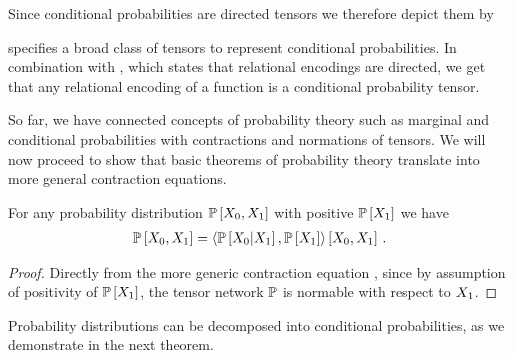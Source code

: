 Since conditional probabilities are directed tensors we therefore depict them by
\begin{center}
	
\end{center}


%
 specifies a broad class of tensors to represent conditional probabilities.
In combination with , which states that relational encodings are directed, we get that any relational encoding of a function is a conditional probability tensor.


So far, we have connected concepts of probability theory such as marginal and conditional probabilities with contractions and normations of tensors.
We will now proceed to show that basic theorems of probability theory translate into more general contraction equations.

\begin{theorem}\label{the:bayes}
	For any probability distribution $\mathbb{P}\left[X_{0}, X_{1}\right]$ with positive $\mathbb{P}\left[X_{1}\right]$ we have
	\begin{align*}
		\mathbb{P}\left[X_{0},X_{1}\right] 
		= \left\langle \mathbb{P}\left[X_{0}|X_{1}\right],\mathbb{P}\left[X_{1}\right]\right\rangle \left[ X_{0},X_{1} \right] \, . 
	\end{align*}
\end{theorem}
\begin{proof}
	Directly from the more generic contraction equation , since by assumption of positivity of $\mathbb{P}\left[X_{1}\right]$, the tensor network $\mathbb{P}$ is normable with respect to $X_{1}$.
\end{proof}


Probability distributions can be decomposed into conditional probabilities, as we demonstrate in the next theorem.

